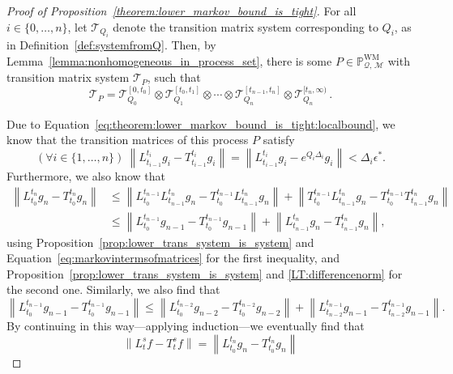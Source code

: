 \documentclass[10pt,a4paper]{paper}
\theoremstyle{definition}
\newcommand{\processes}{\mathbb{P}}
\newcommand{\wmprocesses}{\processes^{\mathrm{WM}}}
\newcommand{\rateset}{\mathcal{Q}}
\newcommand{\norm}[1]{\left\lVert #1 \right\rVert}
\begin{document}
\begin{proof}[Proof of Proposition~\ref{theorem:lower_markov_bound_is_tight}]
For all $i\in\{0,\ldots,n\}$, let $\mathcal{T}_{Q_i}$ denote the transition matrix system corresponding to $Q_i$, as in Definition~\ref{def:systemfromQ}. Then, by Lemma~\ref{lemma:nonhomogeneous_in_process_set}, there is some $P\in\wmprocesses_{\rateset,\,\mathcal{M}}$ with transition matrix system $\mathcal{T}_P$, such that
\begin{equation*}
\mathcal{T}_P = \mathcal{T}_{Q_0}^{[0,t_0]}\otimes \mathcal{T}_{Q_1}^{[t_0,t_1]}\otimes \cdots \otimes \mathcal{T}_{Q_n}^{[t_{n-1},t_n]} \otimes \mathcal{T}_{Q_n}^{[t_{n},\infty)}\,.
\end{equation*}

Due to Equation~\eqref{eq:theorem:lower_markov_bound_is_tight:localbound}, we know that the transition matrices of this process $P$ satisfy
\begin{equation}\label{eq:theorem:lower_markov_bound_is_tight:localbounds}
(\forall i\in\{1,\ldots,n\})~
\norm{L_{t_{i-1}}^{t_i}g_i - T_{t_{i-1}}^{t_i}g_i}= \norm{L_{t_{i-1}}^{t_i}g_i - e^{Q_i\Delta_i}g_i}<\Delta_i\epsilon^*.
\end{equation}
Furthermore, we also know that
\begin{align*}
\norm{L_{t_0}^{t_n}g_n - T_{t_0}^{t_n}g_n} 
 &\leq \norm{L_{t_0}^{t_{n-1}}L_{t_{n-1}}^{t_n}g_n - T_{t_0}^{t_{n-1}}L_{t_{n-1}}^{t_n}g_n} + \norm{T_{t_0}^{t_{n-1}}L_{t_{n-1}}^{t_n}g_n - T_{t_0}^{t_{n-1}}T_{t_{n-1}}^{t_n}g_n} \\
 &\leq \norm{L_{t_0}^{t_{n-1}}g_{n-1} - T_{t_0}^{t_{n-1}}g_{n-1}} + \norm{L_{t_{n-1}}^{t_n}g_n - T_{t_{n-1}}^{t_n}g_n},
\end{align*}
using Proposition~\ref{prop:lower_trans_system_is_system} and Equation~\eqref{eq:markovintermsofmatrices} for the first inequality, and Proposition~\ref{prop:lower_trans_system_is_system} and \ref{LT:differencenorm} for the second one.
Similarly, we also find that
\begin{equation*}
\norm{L_{t_0}^{t_{n-1}}g_{n-1} - T_{t_0}^{t_{n-1}}g_{n-1}}
\leq \norm{L_{t_0}^{t_{n-2}}g_{n-2} - T_{t_0}^{t_{n-2}}g_{n-2}} + \norm{L_{t_{n-2}}^{t_{n-1}}g_{n-1} - T_{t_{n-2}}^{t_{n-1}}g_{n-1}}.
\end{equation*}
By continuing in this way---applying induction---we eventually find that
\begin{equation*}
\norm{L_t^sf - T_t^sf}=\norm{L_{t_0}^{t_n}g_n - T_{t_0}^{t_n}g_n} 

\end{equation*}
\end{proof}
\end{document}
